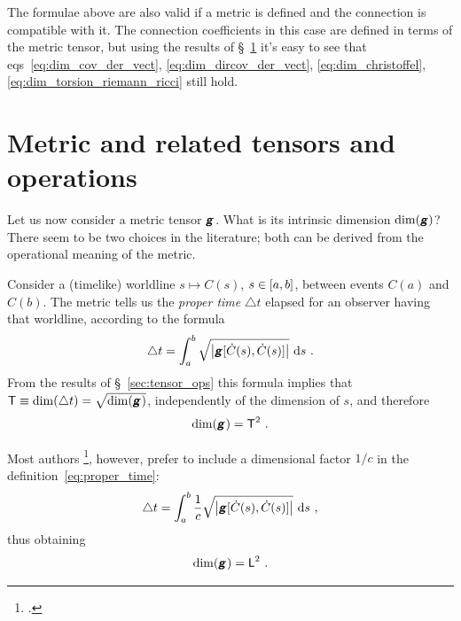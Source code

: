 \documentclass[\ifafour a4paper,12pt,\else a5paper,10pt,\fi%
onecolumn,oneside,article,%
british%
]{memoir}
\makeatletter
\theoremstyle{remark}
\theoremstyle{innote}
\newcommand*{\mathte}[1]{\textbf{\textit{\textsf{#1}}}}
\newcommand*{\citep}{\footcites}
\newcommand*{\di}{\mathrm{d}}%
\newcommand*{\incr}{\triangle}%
\DeclarePairedDelimiter\clcl{[}{]}
\DeclarePairedDelimiter\abs{\lvert}{\rvert}
\renewcommand*{\|}[1][]{\nonscript\,#1\vert\nonscript\;\mathopen{}}
\newcommand*{\sect}{\S}%
\newcommand*{\chap}{ch.}%
\newcommand*{\eqn}{eq.}%
\newcommand*{\eqns}{eqs}%
\newcommand*{\eg}{{e.g.}}
\newcommand*{\q}{}%
\DeclareRobustCommand*{\q}{%
  \mathord{\mathpalette\bigcdot@{}}%
}
\newcommand*{\bigcdot@scalefactor}{0.7}
\newcommand*{\bigcdot@widthfactor}{1.5}
\newcommand*{\bigcdot@}[2]{%
  \sbox0{$#1\vcenter{}$}%
  \sbox2{$#1\cdot\m@th$}%
  \hbox to \bigcdot@widthfactor\wd2{%
    \hfil
    \raise\ht0\hbox{%
      \scalebox{\bigcdot@scalefactor}{%
        \lower\ht0\hbox{$#1\bullet\m@th$}%
      }%
    }%
    \hfil
  }%
}
\newcommand*{\Le}{\textsf{L}}
\newcommand*{\Ti}{\textsf{T}}
\newcommand*{\yg}{\mathte{g}}
\newcommand*{\ygc}{\mathte{g}}
\renewcommand*{\i}{\indices}
\newcommand*{\inct}{\incr t}
\makeatother
\begin{document}
\medskip

The formulae above are also valid if a metric is defined and the connection
is compatible with it. The connection coefficients in this case are defined
in terms of the metric tensor, but using the results of
\sect~\ref{sec:metric} it's easy to see that
\eqns~\eqref{eq:dim_cov_der_vect}, \eqref{eq:dim_dircov_der_vect},
\eqref{eq:dim_christoffel}, \eqref{eq:dim_torsion_riemann_ricci} still
hold.


\section{Metric and related tensors and operations}
\label{sec:metric}

Let us now consider a metric tensor $\yg\i{_{\q\q}}$. What is its intrinsic
dimension $\dim(\yg)$? There seem to be two choices in the literature; both
can be derived from the operational meaning of the metric.


Consider a (timelike) worldline $s \mapsto C(s)$, $s\in \clcl{a,b}$,
between events $C(a)$ and $C(b)$. The metric tells us the \emph{proper
  time} $\inct$ elapsed for an observer having that worldline, according to
the formula
\begin{equation}%
  \label{eq:proper_time}
\inct =  \int_a^b
\sqrt{\abs*{\yg[\dot{C}(s),\dot{C}(s)]}} \  \di s\ .
\end{equation}
From the results of \sect~\ref{sec:tensor_ops} this formula implies that
 $\Ti \equiv \dim(\inct) = \sqrt{\dim(\yg\i{_{\q\q}})}$,
independently of the dimension of $s$, and therefore
\begin{equation}%
  \label{eq:dim_g}
  \dim(\yg\i{_{\q\q}}) = \Ti^{2}\ .
\end{equation}

Most authors \citep[\eg][\sect~V.62 \eqn~(62.02)]{fock1955_t1964}[\chap~11
\eqn~(11.21)]{curtisetal1985}[\sect~5.3
\eqn~(5.6)]{rindler1969_r1986}[\chap~6 \eqn~(6.24)]{hartle2003}, however,
prefer to include a dimensional factor $1/c$ in the
definition~\eqref{eq:proper_time}:
\begin{equation}%
  \label{eq:proper_time_c}
  \inct = \int_a^b
  \frac{1}{c} \sqrt{\abs*{\ygc[\dot{C}(s),\dot{C}(s)]}} \ \di s\ ,
\end{equation}
thus obtaining
\begin{equation}%
  \label{eq:dim_g_c}
  \dim(\ygc\i{_{\q\q}}) = \Le^{2}\ .
\end{equation}
\end{document}
